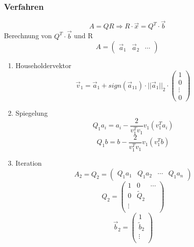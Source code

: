 \subsubsection*{Verfahren}
\begin{equation*}
	A = Q R \Rightarrow R \cdot \vec{x} = Q^T \cdot \vec{b}
\end{equation*}
Berechnung von $Q^T \cdot \vec{b}$ und R
\begin{displaymath}
	A =
	\begin{pmatrix}
		\vec{a}_1 & \vec{a}_2 & \cdots
	\end{pmatrix}
\end{displaymath}
\begin{enumerate}

	\item Householdervektor
	\begin{displaymath}
		\vec{v}_1 = \vec{a}_1 + sign(\vec{a}_{11}) \cdot ||\vec{a}_1||_2 \cdot
		\begin{pmatrix}
			1 \\ 0 \\ \vdots \\ 0
		\end{pmatrix}
	\end{displaymath}
	
	\item Spiegelung
	\begin{equation*}
		Q_1a_i = a_i - \frac{2}{v_1^Tv_1}v_1(v_1^T a_i)
	\end{equation*}
	\begin{equation*}
		Q_1b = b - \frac{2}{v_1^Tv_1}v_1(v_1^T b)
	\end{equation*}
	
	\item Iteration
	\begin{displaymath}
		A_2 = Q_2 =
		\begin{pmatrix}
			Q_1a_1 & Q_1a_2 & \cdots & Q_1a_n
		\end{pmatrix}
	\end{displaymath}
	\begin{displaymath}
		Q_2 =
		\begin{pmatrix}
			1 & 0 & \cdots \\
			0 & \widetilde{Q}_2 & \\
			\vdots & & \\
		\end{pmatrix}
	\end{displaymath}
	\begin{displaymath}
		\vec{b}_2 =
		\begin{pmatrix}
			1 \\
			\widetilde{b}_2 \\
			\vdots \\
		\end{pmatrix}
	\end{displaymath}
	

\end{enumerate}
